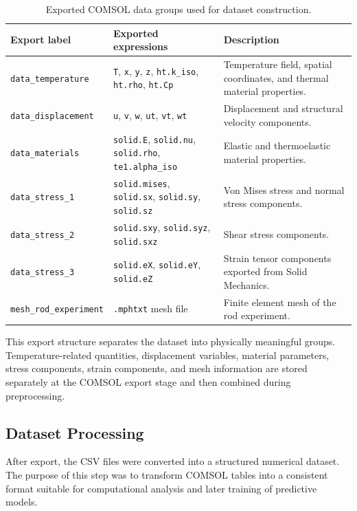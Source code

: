 \begin{table}[H]
\centering
\caption{Exported COMSOL data groups used for dataset construction.}
\label{tab:comsol_export_groups}
\begin{tabular}{p{} p{} p{}}
\hline
\textbf{Export label} & \textbf{Exported expressions} & \textbf{Description} \\
\hline
\texttt{data\_temperature} & 
\texttt{T}, \texttt{x}, \texttt{y}, \texttt{z}, \texttt{ht.k\_iso}, \texttt{ht.rho}, \texttt{ht.Cp} &
Temperature field, spatial coordinates, and thermal material properties. \\
\hline
\texttt{data\_displacement} &
\texttt{u}, \texttt{v}, \texttt{w}, \texttt{ut}, \texttt{vt}, \texttt{wt} &
Displacement and structural velocity components. \\
\hline
\texttt{data\_materials} &
\texttt{solid.E}, \texttt{solid.nu}, \texttt{solid.rho}, \texttt{te1.alpha\_iso} &
Elastic and thermoelastic material properties. \\
\hline
\texttt{data\_stress\_1} &
\texttt{solid.mises}, \texttt{solid.sx}, \texttt{solid.sy}, \texttt{solid.sz} &
Von Mises stress and normal stress components. \\
\hline
\texttt{data\_stress\_2} &
\texttt{solid.sxy}, \texttt{solid.syz}, \texttt{solid.sxz} &
Shear stress components. \\
\hline
\texttt{data\_stress\_3} &
\texttt{solid.eX}, \texttt{solid.eY}, \texttt{solid.eZ} &
Strain tensor components exported from Solid Mechanics. \\
\hline
\texttt{mesh\_rod\_experiment} &
\texttt{.mphtxt} mesh file &
Finite element mesh of the rod experiment. \\
\hline
\end{tabular}
\end{table}

This export structure separates the dataset into physically meaningful groups. Temperature-related quantities, displacement variables, material parameters, stress components, strain components, and mesh information are stored separately at the COMSOL export stage and then combined during preprocessing.

\subsection{Dataset Processing}

After export, the CSV files were converted into a structured numerical dataset. The purpose of this step was to transform COMSOL tables into a consistent format suitable for computational analysis and later training of predictive models.

